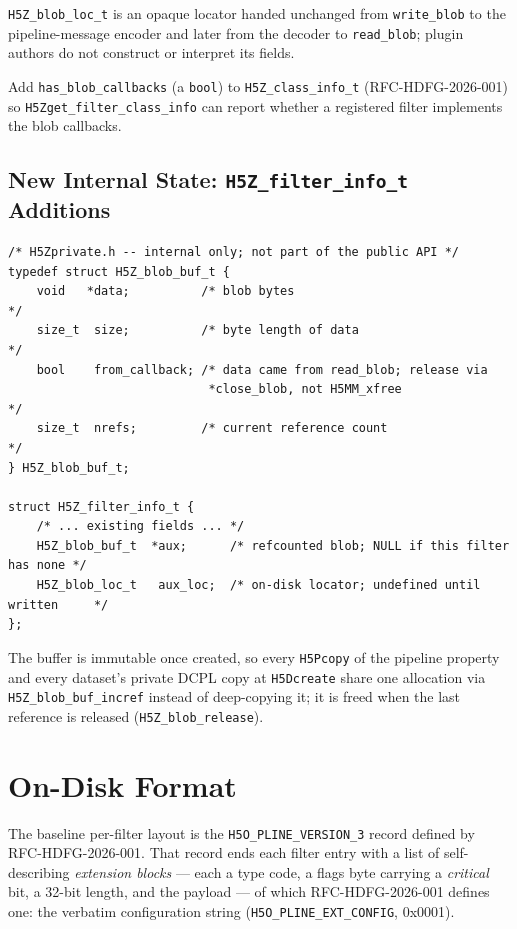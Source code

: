 \documentclass[../RFC-HDFG-2026-003.tex]{subfiles}
\begin{document}
\texttt{H5Z\_blob\_loc\_t} is an opaque locator handed unchanged from
\texttt{write\_blob} to the pipeline-message encoder and later from the
decoder to \texttt{read\_blob}; plugin authors do not construct or
interpret its fields.

Add \texttt{has\_blob\_callbacks} (a \texttt{bool}) to
\texttt{H5Z\_class\_info\_t} (RFC-HDFG-2026-001) so
\texttt{H5Zget\_filter\_class\_info} can report whether a registered
filter implements the blob callbacks.

\subsection{New Internal State: \texttt{H5Z\_filter\_info\_t} Additions}
\label{sec:blob-internal-state}

\begin{verbatim}
/* H5Zprivate.h -- internal only; not part of the public API */
typedef struct H5Z_blob_buf_t {
    void   *data;          /* blob bytes                                    */
    size_t  size;          /* byte length of data                          */
    bool    from_callback; /* data came from read_blob; release via
                            *close_blob, not H5MM_xfree                    */
    size_t  nrefs;         /* current reference count                     */
} H5Z_blob_buf_t;

struct H5Z_filter_info_t {
    /* ... existing fields ... */
    H5Z_blob_buf_t  *aux;      /* refcounted blob; NULL if this filter has none */
    H5Z_blob_loc_t   aux_loc;  /* on-disk locator; undefined until written     */
};
\end{verbatim}

The buffer is immutable once created, so every \texttt{H5Pcopy} of the
pipeline property and every dataset's private DCPL copy at
\texttt{H5Dcreate} share one allocation via
\texttt{H5Z\_blob\_buf\_incref} instead of deep-copying it; it is freed
when the last reference is released (\texttt{H5Z\_blob\_release}).


\section{On-Disk Format}
\label{sec:blob-format}

The baseline per-filter layout is the \texttt{H5O\_PLINE\_VERSION\_3}
record defined by RFC-HDFG-2026-001.  That record ends each filter entry
with a list of self-describing \emph{extension blocks} --- each a type
code, a flags byte carrying a \emph{critical} bit, a 32-bit length, and
the payload --- of which RFC-HDFG-2026-001 defines one: the verbatim
configuration string (\texttt{H5O\_PLINE\_EXT\_CONFIG}, 0x0001).
\end{document}
